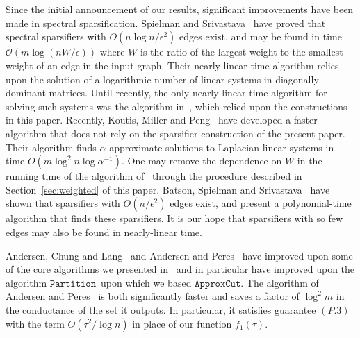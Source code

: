 \documentclass[11pt]{article}
\newcommand{\approxcut}{\ensuremath{\mathtt{ApproxCut}}}
\newcommand{\partition}{\ensuremath{\mathtt{Partition}}}
\def\softO#1{\widetilde{\mathcal{O}} \left( #1 \right)}
\begin{document}
Since the initial announcement \cite{SpielmanTengPrecon} 
  of our results, significant improvements 
  have been made in spectral sparsification. 
Spielman and Srivastava~\cite{SpielmanSrivastava} have
  proved that spectral sparsifiers with $O (n \log n / \epsilon^{2})$ edges
  exist, and may be found in time $\softO{m \log (n W / \epsilon)}$ where
  $W$ is the ratio of the largest weight to the smallest 
  weight of an edge in the input graph.
Their nearly-linear time algorithm relies upon the solution of a logarithmic
  number of linear systems in diagonally-dominant matrices.
Until recently, the only nearly-linear time algorithm for solving such systems
  was the algorithm in~\cite{SpielmanTengLinsolve}, which relied upon the constructions
  in this paper.
Recently, Koutis, Miller and Peng~\cite{KMP} have developed a faster
  algorithm that does not rely on the sparsifier construction of the present paper.
Their algorithm finds $\alpha $-approximate solutions to Laplacian linear systems
  in time $O (m \log^{2} n \log \alpha^{-1})$.
One may remove the dependence on $W$ in the running time of the
  algorithm of~\cite{SpielmanSrivastava} through the procedure
  described in Section~\ref{sec:weighted} of this paper.
Batson, Spielman and Srivastava~\cite{BatsonSpielmanSrivastava}
  have shown that sparsifiers with $O (n / \epsilon^{2})$ edges exist, and
  present a polynomial-time algorithm that finds these sparsifiers.
It is our hope that sparsifiers with so few edges may also be found
  in nearly-linear time.

Andersen, Chung and Lang~\cite{AndersenChungLang} 
  and Andersen and Peres~\cite{AndersenPeres} have
  improved upon some of the core algorithms we presented in~\cite{SpielmanTengCuts}
  and in particular have improved upon the algorithm \partition \ upon which
  we based \approxcut.
The algorithm of Andersen and Peres~\cite{AndersenPeres} is both significantly
  faster and saves a factor of $\log^{2} m$ in the conductance of the set it
  outputs.
In particular, it satisfies guarantee $(P.3)$ with the term
  $O (\tau^{2} / \log n)$ in place of our function $f_{1} (\tau )$.




\end{document}
